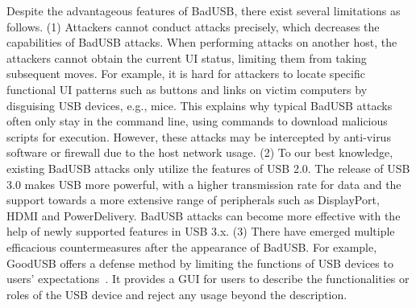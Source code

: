 Despite the advantageous features of BadUSB, there exist several limitations as
follows.  (1) Attackers cannot conduct attacks precisely, which decreases the
capabilities of BadUSB attacks.  When performing attacks on another host, the
attackers cannot obtain the current \ac{UI} status, limiting
them from taking subsequent moves.  For example, it is hard for attackers to
locate specific functional \ac{UI} patterns such as buttons and links on victim
computers by disguising \ac{USB} devices, e.g., mice.  This explains why typical
BadUSB attacks often only stay in the command line, using commands to download
malicious scripts for execution.  However, these attacks may be intercepted by
anti-virus software or firewall due to the host network usage.  (2) To
our best knowledge, existing BadUSB attacks only utilize the features of \ac{USB}
2.0.  The release of \ac{USB} 3.0 makes \ac{USB} more powerful, with a higher
transmission rate for data and the support towards a more extensive range of
peripherals such as DisplayPort, HDMI and PowerDelivery.  BadUSB attacks
can become more effective with the help of newly supported features in \ac{USB} 3.x.
(3) There have emerged multiple efficacious countermeasures after the
appearance of BadUSB.  For example, GoodUSB offers a defense method by limiting
the functions of \ac{USB} devices to users' expectations~\cite{tian2015defending}.
It provides a \ac{GUI} for users to describe the functionalities or
roles of the \ac{USB} device and reject any usage beyond the description.

